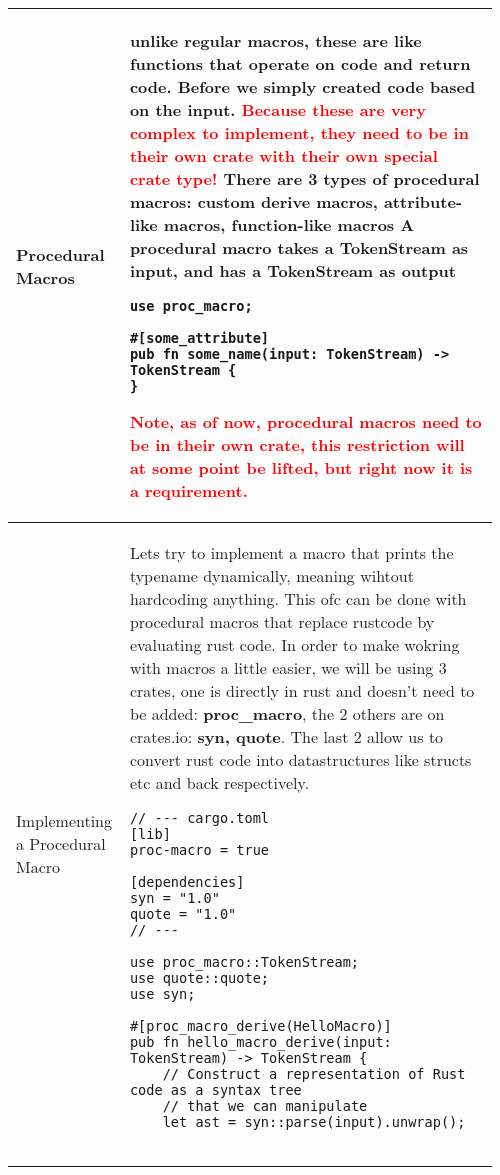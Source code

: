 \documentclass[main.tex,fontsize=8pt,paper=a4,paper=portrait,DIV=calc,]{scrartcl}
\begin{document}
\begin{table}[ht!]
\begin{tabular}{|m{0.2\linewidth}|m{0.755\linewidth}|}
\hline
Procedural Macros & 
unlike regular macros, these are like functions that operate on code and return code.\newline
Before we simply created code based on the input.\newline
\textcolor{red}{Because these are very complex to implement, they need to be in their own crate with their own \textbf{special crate type!}}\newline
There are 3 types of procedural macros: \textbf{custom derive macros, attribute-like macros, function-like macros}\newline
\textcolor{OliveGreen}{A procedural macro takes a \textbf{TokenStream as input, and has a TokenStream as output}}\newline
\begin{lstlisting}
use proc_macro;

#[some_attribute]
pub fn some_name(input: TokenStream) -> TokenStream {
}
\end{lstlisting}
\textcolor{red}{Note, as of now, procedural macros need to be in their own crate, this restriction will at some point be lifted, but right now it is a requirement.}\\
\hline
Implementing a Procedural Macro & 
Lets try to implement a macro that prints the typename dynamically, meaning wihtout hardcoding anything.\newline
This ofc can be done with procedural macros that replace rustcode by evaluating rust code.\newline
In order to make wokring with macros a little easier, we will be using 3 crates, one is directly in rust and doesn't need to be added: \textbf{proc\_macro}, the 2 others are on crates.io: \textbf{syn, quote}.\newline
The last 2 allow us to convert rust code into datastructures like structs etc and back respectively.\newline
\begin{lstlisting}
// --- cargo.toml
[lib]
proc-macro = true

[dependencies]
syn = "1.0"
quote = "1.0"
// ---

use proc_macro::TokenStream;
use quote::quote;
use syn;

#[proc_macro_derive(HelloMacro)]
pub fn hello_macro_derive(input: TokenStream) -> TokenStream {
    // Construct a representation of Rust code as a syntax tree
    // that we can manipulate
    let ast = syn::parse(input).unwrap();


\end{lstlisting}
\end{tabular}
\end{table}
\end{document}
